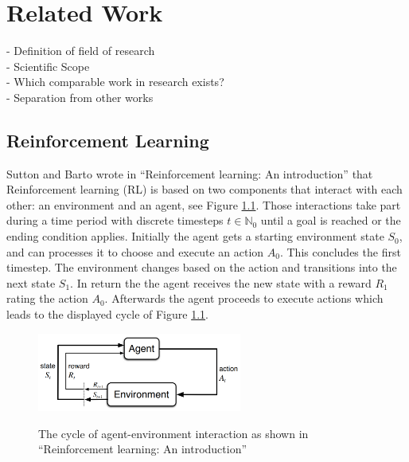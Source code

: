 %
%
\chapter{Related Work}\label{sec:RelatedWork}
- Definition of field of research \\
- Scientific Scope \\
- Which comparable work in research exists? \\
- Separation from other works

\section{Reinforcement Learning}
Sutton and Barto wrote in ``Reinforcement learning: An introduction''\cite{suba18}
that Reinforcement learning (RL)
is based on two components that interact with each other: an environment and
an agent, see Figure \ref{fig:rl_cycle}. Those interactions take part during a
time period with discrete timesteps $t\in\mathbb{N}_0$ until a
goal is reached or the ending condition applies. Initially
the agent gets a starting environment state $S_0$, and can processes it to choose
and execute an action $A_0$. This concludes the first timestep. The environment
changes based on the action and transitions into the next state $S_{1}$. In return the the agent
receives the new state with a reward $R_{1}$ rating the action $A_0$. Afterwards the agent
proceeds to execute actions which leads to the displayed cycle of Figure \ref{fig:rl_cycle}.
\begin{figure}[hpbt]
    \centering
    \includegraphics[width=0.6\textwidth]{pictures/RLInteractionSB}\\
    \caption[reinforcement learning cycle]{The cycle of agent-environment interaction as
        shown in ``Reinforcement learning: An introduction''\cite{suba18}}\label{fig:rl_cycle}
\end{figure}

